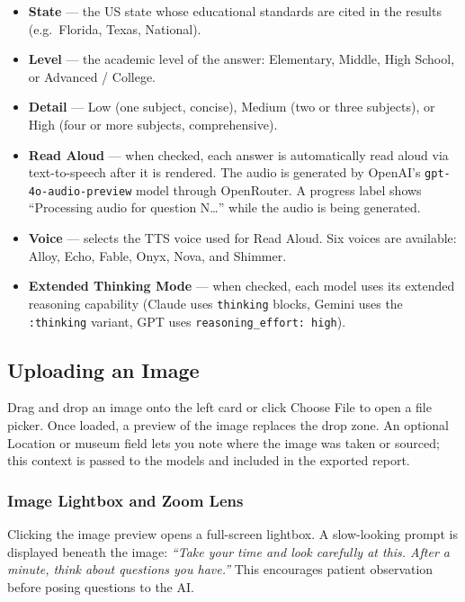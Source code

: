 \documentclass[11pt]{article}
\begin{document}
\begin{itemize}[nosep]
  \item \textbf{State} --- the US state whose educational standards are
        cited in the results (e.g.\ Florida, Texas, National).
  \item \textbf{Level} --- the academic level of the answer: Elementary,
        Middle, High School, or Advanced / College.
  \item \textbf{Detail} --- Low (one subject, concise), Medium (two or
        three subjects), or High (four or more subjects, comprehensive).
  \item \textbf{Read Aloud} --- when checked, each answer is automatically
        read aloud via text-to-speech after it is rendered. The audio is
        generated by OpenAI's \texttt{gpt-4o-audio-preview} model through
        OpenRouter. A progress label shows ``Processing audio for question
        N\ldots'' while the audio is being generated.
  \item \textbf{Voice} --- selects the TTS voice used for Read Aloud.
        Six voices are available: Alloy, Echo, Fable, Onyx, Nova, and
        Shimmer.
  \item \textbf{Extended Thinking Mode} --- when checked, each model uses
        its extended reasoning capability (Claude uses \texttt{thinking}
        blocks, Gemini uses the \texttt{:thinking} variant, GPT uses
        \texttt{reasoning\_effort: high}).
\end{itemize}

\subsection{Uploading an Image}

Drag and drop an image onto the left card or click \textsf{Choose File}
to open a file picker. Once loaded, a preview of the image replaces the
drop zone. An optional \textsf{Location or museum} field lets you note
where the image was taken or sourced; this context is passed to the
models and included in the exported report.

\subsubsection{Image Lightbox and Zoom Lens}

Clicking the image preview opens a full-screen lightbox. A slow-looking
prompt is displayed beneath the image: \emph{``Take your time and look
carefully at this. After a minute, think about questions you have.''} This
encourages patient observation before posing questions to the AI.
\end{document}
